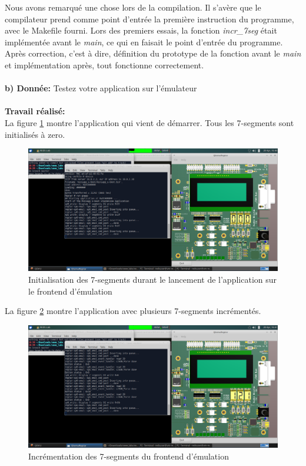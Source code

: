 Nous avons remarqué une chose lors de la compilation. Il s'avère que le compilateur prend comme point d'entrée la première instruction du programme, avec le Makefile fourni. Lors des premiers essais, la fonction \textit{incr\_7seg} était implémentée avant le \textit{main}, ce qui en faisait le point d'entrée du programme. Après correction, c'est à dire, définition du prototype de la fonction avant le \textit{main} et implémentation après, tout fonctionne correctement.\\\\
\textbf{b) Donnée: }Testez votre application sur l’émulateur\\\\
\textbf{Travail réalisé: }\\
La figure \ref{emul_miniapp_init} montre l'application qui vient de démarrer. Tous les 7-segments sont initialisés à zero.
\begin{figure}[H]
	\begin{center}
		\includegraphics[width=16cm]{img/emul_test_miniapp_init.png}
		\caption{Initialisation des 7-segments durant le lancement de l'application sur le frontend d'émulation}
		\label{emul_miniapp_init}
	\end{center}
\end{figure}
La figure \ref{emul_miniapp_counting} montre l'application avec plusieurs 7-segments incrémentés.
\begin{figure}[H]
	\begin{center}
		\includegraphics[width=16cm]{img/emul_test_miniapp_counting.png}
		\caption{Incrémentation des 7-segments du frontend d'émulation}
		\label{emul_miniapp_counting}
	\end{center}
\end{figure}
